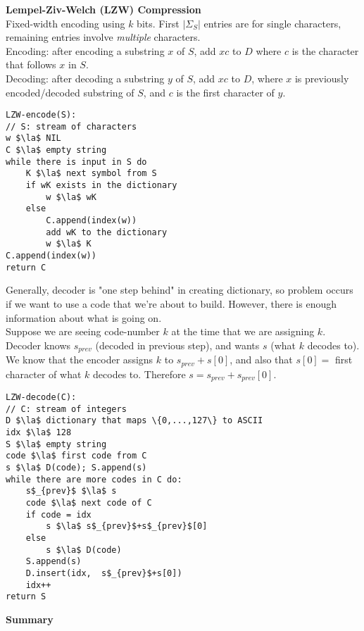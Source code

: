 \documentclass[12pt]{article}
\newcommand{\la}{\leftarrow}
\begin{document}
{\textbf{Lempel-Ziv-Welch (LZW) Compression}\\

Fixed-width encoding using $k$ bits. First $|\Sigma_S|$ entries are for single characters, remaining entries involve \emph{multiple} characters.\\
Encoding: after encoding a substring $x$ of $S$, add $xc$ to $D$ where $c$ is the character that follows $x$ in $S$.\\
Decoding: after decoding a substring $y$ of $S$, add $xc$ to $D$, where $x$ is previously encoded/decoded substring of $S$, and $c$ is the first character of $y$.
\begin{lstlisting}[mathescape=true]
LZW-encode(S):
// S: stream of characters
w $\la$ NIL
C $\la$ empty string
while there is input in S do
	K $\la$ next symbol from S
	if wK exists in the dictionary
		w $\la$ wK
	else
		C.append(index(w))
		add wK to the dictionary
		w $\la$ K
C.append(index(w))
return C
\end{lstlisting}
Generally, decoder is "one step behind" in creating dictionary, so problem occurs if we want to use a code that we're about to build. However, there is enough information about what is going on.\\
Suppose we are seeing code-number $k$ at the time that we are assigning $k$. Decoder knows $s_{prev}$ (decoded in previous step), and wants $s$ (what $k$ decodes to). We know that the encoder assigns $k$ to $s_{prev} + s[0]$, and also that $s[0] = $ first character of what $k$ decodes to. Therefore $s = s_{prev} + s_{prev}[0]$.
\begin{lstlisting}[mathescape=true]
LZW-decode(C):
// C: stream of integers
D $\la$ dictionary that maps \{0,...,127\} to ASCII
idx $\la$ 128
S $\la$ empty string
code $\la$ first code from C
s $\la$ D(code); S.append(s)
while there are more codes in C do:
	s$_{prev}$ $\la$ s
	code $\la$ next code of C
	if code = idx
		s $\la$ s$_{prev}$+s$_{prev}$[0]
	else
		s $\la$ D(code)
	S.append(s)
	D.insert(idx,  s$_{prev}$+s[0])
	idx++
return S
\end{lstlisting}

\textbf{Summary}\\

}
\end{document}
